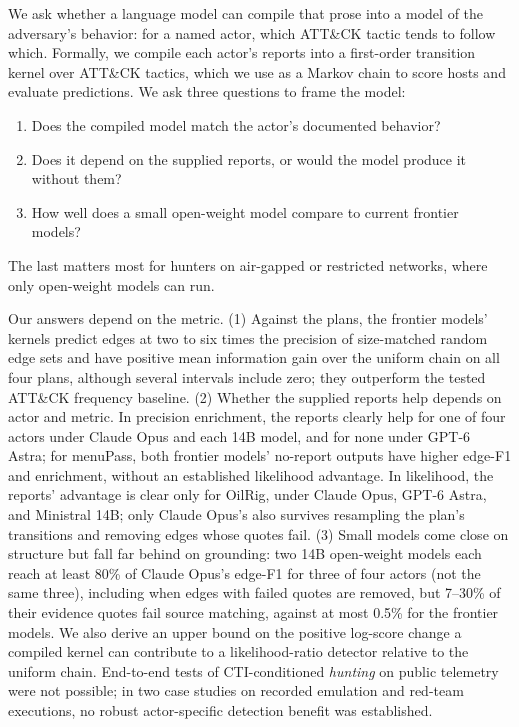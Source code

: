 \documentclass[letterpaper]{article}
\begin{document}
We ask whether a language model can compile that prose into a model of the adversary's behavior: for a named actor, which ATT\&CK tactic tends to follow which. Formally, we compile each actor's reports into a first-order transition kernel over ATT\&CK tactics, which we use as a Markov chain to score hosts and evaluate predictions. We ask three questions to frame the model:
\begin{enumerate}
    \item Does the compiled model match the actor's documented behavior?
    \item Does it depend on the supplied reports, or would the model produce it without them?
    \item How well does a small open-weight model compare to current frontier models?
\end{enumerate}
The last matters most for hunters on air-gapped or restricted networks, where only open-weight models can run.

Our answers depend on the metric. (1) Against the plans, the frontier models' kernels predict edges at two to six times the precision of size-matched random edge sets and have positive mean information gain over the uniform chain on all four plans, although several intervals include zero; they outperform the tested ATT\&CK frequency baseline. (2) Whether the supplied reports help depends on actor and metric. In precision enrichment, the reports clearly help for one of four actors under Claude Opus and each 14B model, and for none under GPT-6 Astra; for menuPass, both frontier models' no-report outputs have higher edge-F1 and enrichment, without an established likelihood advantage. In likelihood, the reports' advantage is clear only for OilRig, under Claude Opus, GPT-6 Astra, and Ministral 14B; only Claude Opus's also survives resampling the plan's transitions and removing edges whose quotes fail. (3) Small models come close on structure but fall far behind on grounding: two 14B open-weight models each reach at least 80\% of Claude Opus's edge-F1 for three of four actors (not the same three), including when edges with failed quotes are removed, but 7--30\% of their evidence quotes fail source matching, against at most 0.5\% for the frontier models. We also derive an upper bound on the positive log-score change a compiled kernel can contribute to a likelihood-ratio detector relative to the uniform chain. End-to-end tests of CTI-conditioned \emph{hunting} on public telemetry were not possible; in two case studies on recorded emulation and red-team executions, no robust actor-specific detection benefit was established.
\end{document}
